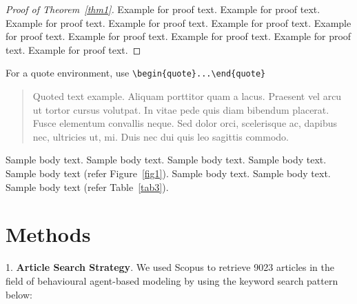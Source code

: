 \documentclass[pdflatex,sn-mathphys-num]{sn-jnl}%
\theoremstyle{thmstyleone}%
\theoremstyle{thmstyletwo}%
\theoremstyle{thmstylethree}%
\begin{document}
\begin{proof}[Proof of Theorem~{\upshape\ref{thm1}}]
Example for proof text. Example for proof text. Example for proof text. Example for proof text. Example for proof text. Example for proof text. Example for proof text. Example for proof text. Example for proof text. Example for proof text. 
\end{proof}

\noindent
For a quote environment, use \verb+\begin{quote}...\end{quote}+
\begin{quote}
Quoted text example. Aliquam porttitor quam a lacus. Praesent vel arcu ut tortor cursus volutpat. In vitae pede quis diam bibendum placerat. Fusce elementum
convallis neque. Sed dolor orci, scelerisque ac, dapibus nec, ultricies ut, mi. Duis nec dui quis leo sagittis commodo.
\end{quote}

Sample body text. Sample body text. Sample body text. Sample body text. Sample body text (refer Figure~\ref{fig1}). Sample body text. Sample body text. Sample body text (refer Table~\ref{tab3}). 

\section{Methods}\label{sec11}

{\Large 1.} \textbf{Article Search Strategy}.
We used Scopus to retrieve 9023 articles in the field of behavioural agent-based modeling by using the keyword search pattern below: 

\vspace{0.70em}

\lstset{
  basicstyle=\ttfamily\small,
  columns=fullflexible,
  breaklines=true,
  keepspaces=true,
  frame=single
}
\end{document}
